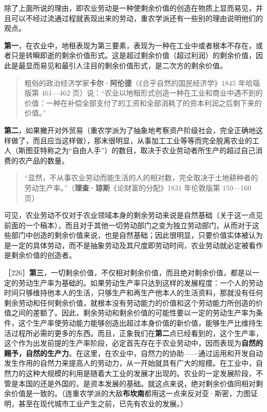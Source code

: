 除了上面所说的理由，即农业劳动是一种使剩余价值的创造在物质上显而易见，并且可以不经过流通过程就表现出来的劳动，重农学派还有一些别的理由说明他们的观点。

\textbf{第一}，在农业中，地租表现为第三要素，表现为一种在工业中或者根本不存在，或者只是转瞬即逝的剩余价值形式。这是超过剩余价值（超过利润）的剩余价值，因此是最显而易见和最引人注目的剩余价值形式，是二次方的剩余价值。

\begin{quote}粗俗的政治经济学家\textbf{卡尔·阿伦德}（《合乎自然的国民经济学》1845 年哈瑙版第 461—462 页）说：“农业以地租形式创造一种在工业和商业中遇不到的价值：一种在补偿全部支付了的工资和全部消耗了的资本利润之后剩下来的价值。”\end{quote}

\textbf{第二}，如果撇开对外贸易（重农学派为了抽象地考察资产阶级社会，完全正确地这样做了，而且应当这样做），那末很明显，从事加工工业等等而完全脱离农业的工人（斯图亚特称之为“自由人手”）的数目，取决于农业劳动者所生产的超过自己消费的农产品的数量。

\begin{quote}“显然，不从事农业劳动而能生活的人的相对数，完全取决于土地耕种者的劳动生产率。”（\textbf{理查·琼斯}《论财富的分配》1831 年伦敦版第 159—160 页）\end{quote}

可见，农业劳动不仅对于农业领域本身的剩余劳动来说是自然基础（关于这一点见前面的一个稿本），而且对于其他一切劳动部门之变为独立劳动部门，从而对于这些部门中创造的剩余价值来说，也是自然基础；因此很明显，只要价值实体被认为是一定的具体劳动，而不是抽象劳动及其尺度即劳动时间，农业劳动就必定被看作是剩余价值的创造者。

［226］\textbf{第三}，一切剩余价值，不仅相对剩余价值，而且绝对剩余价值，都是以一定的劳动生产率为基础的。如果劳动生产率只达到这样的发展程度：一个人的劳动时间只够维持他本人的生活，只够生产和再生产他本人的生活资料，那就没有任何剩余劳动和任何剩余价值，就根本没有劳动能力的价值和这个劳动能力所创造的价值之间的差额了。因此，剩余劳动和剩余价值的可能性要以一定的劳动生产率为条件，这个生产率使劳动能力能够创造出超过本身价值的新价值，能够生产比维持生活过程所必需的更多的东西。而且，正象我们在\textbf{第二}点已经看到的，这个生产率，这个作为出发前提的生产率阶段，必定首先存在于农业劳动中，因而表现为\textbf{自然的赐予，自然的生产力}。在这里，在农业中，自然力的协助——通过运用和开发自动发生作用的自然力来提高人的劳动力，从一开始就具有广大的规模。在工业中，自然力的这种大规模的利用是随着大工业的发展才出现的。农业的一定发展阶段，不管是本国的还是外国的，是资本发展的基础。就这点来说，绝对剩余价值同相对剩余价值是一致的。（连重农学派的大敌\textbf{布坎南}都用这一点来反对亚·斯密，力图证明，甚至在现代城市工业产生之前，已先有农业的发展。）

